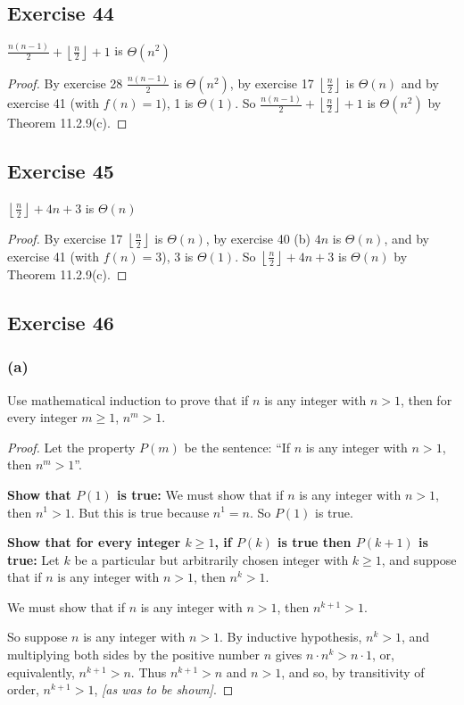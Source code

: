 \documentclass[14pt]{extarticle}
\newcommand{\dps}{\displaystyle}
\newcommand{\floor}[1]{{\left\lfloor#1\right\rfloor}}
\begin{document}
\subsection{Exercise 44}
\(\dps \frac{n(n-1)}{2} + \floor{\frac{n}{2}} + 1\) is \(\Theta(n^2)\)

\begin{proof}
By exercise 28 \(\dps \frac{n(n-1)}{2}\) is \(\Theta(n^2)\), by exercise 17 \(\dps \floor{\frac{n}{2}}\) is \(\Theta(n)\)
and by exercise 41 (with \(f(n) = 1\)), 1 is \(\Theta(1)\). So \(\dps \frac{n(n-1)}{2} + \floor{\frac{n}{2}} + 1\) is 
\(\Theta(n^2)\) by Theorem 11.2.9(c).
\end{proof}

\subsection{Exercise 45}
\(\dps \floor{\frac{n}{2}} + 4n + 3\) is \(\Theta(n)\)

\begin{proof}
By exercise 17 \(\dps \floor{\frac{n}{2}}\) is \(\Theta(n)\),
by exercise 40 (b) \(4n\) is \(\Theta(n)\), and by exercise 41 
(with \(f(n) = 3\)), 3 is \(\Theta(1)\). So \(\dps \floor{\frac{n}{2}} + 4n + 3\) is \(\Theta(n)\) by Theorem 
11.2.9(c).
\end{proof}

\subsection{Exercise 46}
\subsubsection{(a)}
Use mathematical induction to prove that if \(n\) is any integer with \(n > 1\), then for every integer \(m \geq 1\), 
\(n^m > 1\).

\begin{proof}
Let the property \(P(m)\) be the sentence: ``If \(n\) is any integer with \(n > 1\), then \(n^m > 1\)''.

{\bf Show that \(P(1)\) is true:} We must show that if \(n\) is any integer with \(n > 1\), then \(n^1 > 1\). But this is 
true because \(n^1 = n\). So \(P(1)\) is true.

{\bf Show that for every integer \(k \geq 1\), if \(P(k)\) is true then \(P(k + 1)\) is true:} Let \(k\) be a particular but 
arbitrarily chosen integer with \(k \geq 1\), and suppose that if \(n\) is any integer with \(n > 1\), then \(n^k > 1\).

We must show that if \(n\) is any integer with \(n > 1\), then \(n^{k + 1} > 1\). 

So suppose \(n\) is any integer with \(n > 1\). By inductive hypothesis, \(n^k > 1\), and multiplying both sides by the 
positive number \(n\) gives \(n \cdot n^k > n \cdot 1\), or, equivalently, \(n^{k+1} > n\). Thus \(n^{k+1} > n\) and 
\(n > 1\), and so, by transitivity of order, \(n^{k+1} > 1\),  {\it [as was to be shown]}.
\end{proof}
\end{document}

